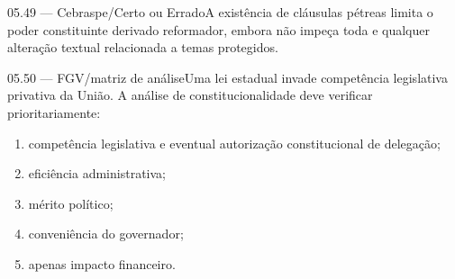 \begin{questao}{ 05.49 — Cebraspe/Certo ou Errado}A existência de cláusulas pétreas limita o poder constituinte derivado reformador, embora não impeça toda e qualquer alteração textual relacionada a temas protegidos.\end{questao}
\begin{questao}{ 05.50 — FGV/matriz de análise}Uma lei estadual invade competência legislativa privativa da União. A análise de constitucionalidade deve verificar prioritariamente:\begin{enumerate}[label=\Alph*)]\item competência legislativa e eventual autorização constitucional de delegação;\item eficiência administrativa;\item mérito político;\item conveniência do governador;\item apenas impacto financeiro.\end{enumerate}\end{questao}
